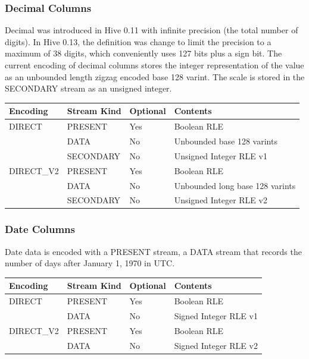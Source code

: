\documentclass{article}
\begin{document}
\subsubsection{Decimal Columns}

Decimal was introduced in Hive 0.11 with infinite precision (the total
number of digits). In Hive 0.13, the definition was change to limit
the precision to a maximum of 38 digits, which conveniently uses 127
bits plus a sign bit. The current encoding of decimal columns stores
the integer representation of the value as an unbounded length zigzag
encoded base 128 varint. The scale is stored in the SECONDARY stream
as an unsigned integer.

\vspace{10pt}
\begin{tabular}{| l | l | l | l |}
\hline
Encoding & Stream Kind & Optional & Contents \\
\hline
DIRECT & PRESENT    & Yes & Boolean RLE\\
       & DATA       & No  & Unbounded base 128 varints\\
       & SECONDARY  & No  & Unsigned Integer RLE v1\\
\hline
DIRECT\_V2 & PRESENT   & Yes & Boolean RLE\\
          & DATA       & No  & Unbounded long base 128 varints\\
          & SECONDARY  & No  & Unsigned Integer RLE v2\\
\hline
\end{tabular}

\subsubsection{Date Columns}

Date data is encoded with a PRESENT stream, a DATA stream that records
the number of days after January 1, 1970 in UTC.

\vspace{10pt}
\begin{tabular}{| l | l | l | l |}
\hline
Encoding & Stream Kind & Optional & Contents \\
\hline
DIRECT & PRESENT & Yes & Boolean RLE\\
       & DATA    & No  & Signed Integer RLE v1\\
\hline
DIRECT\_V2 & PRESENT & Yes & Boolean RLE\\
           & DATA    & No  & Signed Integer RLE v2\\
\hline
\end{tabular}
\end{document}
